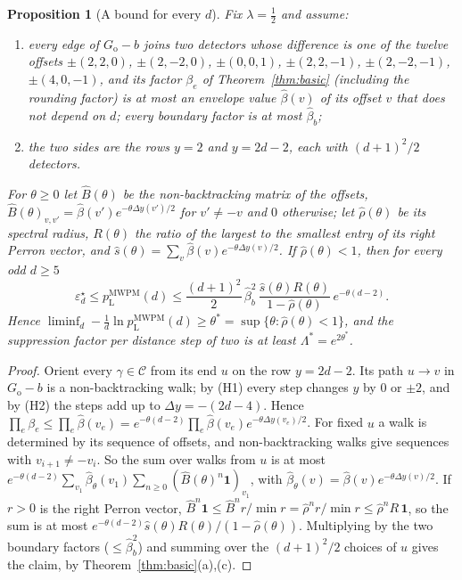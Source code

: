 \documentclass[11pt]{article}
\theoremstyle{plain}
\newtheorem{proposition}{Proposition}
\theoremstyle{definition}
\theoremstyle{remark}
\newcommand{\pM}{p_{\mathrm{L}}^{\mathrm{MWPM}}}
\newcommand{\err}{\varepsilon^{\star}}
\newcommand{\Go}{G_{\mathrm{o}}}
\newcommand{\cC}{\mathcal{C}}
\newcommand{\one}{\mathbf 1}
\renewcommand{\_}{\oldunderscore\allowbreak}
\begin{document}
\begin{proposition}[A bound for every $d$]\label{prop:lattice}
Fix $\lambda=\tfrac12$ and assume:
\begin{enumerate}[label=(H\arabic*),leftmargin=*]
\item every edge of $\Go-b$ joins two detectors whose difference is one of the twelve offsets $\pm(2,2,0)$, $\pm(2,-2,0)$, $\pm(0,0,1)$, $\pm(2,2,-1)$, $\pm(2,-2,-1)$, $\pm(4,0,-1)$, and its factor $\beta_e$ of Theorem~\ref{thm:basic} (including the rounding factor) is at most an envelope value $\hat\beta(v)$ of its offset $v$ that does not depend on $d$; every boundary factor is at most $\hat\beta_b$;
\item the two sides are the rows $y=2$ and $y=2d-2$, each with $(d+1)^2/2$ detectors.
\end{enumerate}
For $\theta\ge0$ let $\hat B(\theta)$ be the non-backtracking matrix of the offsets, $\hat B(\theta)_{v,v'}=\hat\beta(v')e^{-\theta\Delta y(v')/2}$ for $v'\ne-v$ and $0$ otherwise; let $\hat\rho(\theta)$ be its spectral radius, $R(\theta)$ the ratio of the largest to the smallest entry of its right Perron vector, and $\hat s(\theta)=\sum_v\hat\beta(v)e^{-\theta\Delta y(v)/2}$. If $\hat\rho(\theta)<1$, then for every odd $d\ge5$
\[
\err_d\le\pM(d)\le\frac{(d+1)^2}{2}\,\hat\beta_b^2\,\frac{\hat s(\theta)R(\theta)}{1-\hat\rho(\theta)}\,e^{-\theta(d-2)}.
\]
Hence $\liminf_d-\frac1d\ln\pM(d)\ge\theta^\ast=\sup\{\theta:\hat\rho(\theta)<1\}$, and the suppression factor per distance step of two is at least $\Lambda^\ast=e^{2\theta^\ast}$.
\end{proposition}
\begin{proof}
Orient every $\gamma\in\cC$ from its end $u$ on the row $y=2d-2$. Its path $u\to v$ in $\Go-b$ is a non-backtracking walk; by (H1) every step changes $y$ by $0$ or $\pm2$, and by (H2) the steps add up to $\Delta y=-(2d-4)$. Hence $\prod_e\beta_e\le\prod_e\hat\beta(v_e)=e^{-\theta(d-2)}\prod_e\hat\beta(v_e)e^{-\theta\Delta y(v_e)/2}$. For fixed $u$ a walk is determined by its sequence of offsets, and non-backtracking walks give sequences with $v_{i+1}\ne-v_i$. So the sum over walks from $u$ is at most $e^{-\theta(d-2)}\sum_{v_1}\hat\beta_\theta(v_1)\sum_{n\ge0}(\hat B(\theta)^n\one)_{v_1}$, with $\hat\beta_\theta(v)=\hat\beta(v)e^{-\theta\Delta y(v)/2}$. If $r>0$ is the right Perron vector, $\hat B^n\one\le\hat B^nr/\min r=\hat\rho^nr/\min r\le\hat\rho^nR\,\one$, so the sum is at most $e^{-\theta(d-2)}\hat s(\theta)R(\theta)/(1-\hat\rho(\theta))$. Multiplying by the two boundary factors ($\le\hat\beta_b^2$) and summing over the $(d+1)^2/2$ choices of $u$ gives the claim, by Theorem~\ref{thm:basic}(a),(c).
\end{proof}
\end{document}
